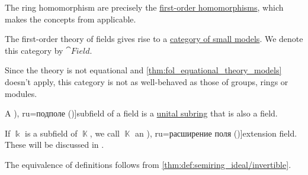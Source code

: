 \begin{definition}
\begin{thmenum}
    The ring homomorphism are precisely the \hyperref[def:fol_homomorphism]{first-order homomorphisms}, which makes the concepts from  applicable.

    \mimprovised The first-order theory of fields gives rise to a \hyperref[def:fol_theory_model_functor/obj]{category of small models}. We denote this category by \( \cat{Field} \).

    Since the theory is not equational and \cref{thm:fol_equational_theory_models} doesn't apply, this category is not as well-behaved as those of groups, rings or modules.

     A \term[bg=подполе (\cite[192]{ГеновМиховскиМоллов1991Алгебра}), ru=подполе (\cite[153]{Тыртышников2017ОсновыАлгебры})]{subfield} of a field is a \hyperref[def:ring/subobject]{unital subring} that is also a field.

    If \( \Bbbk \) is a subfield of \( \BbbK \), we call \( \BbbK \) an \term[bg=разширение на поле (\cite[194]{ГеновМиховскиМоллов1991Алгебра}), ru=расширение поля (\cite[160]{Кострикин2020АлгебраЧасть1})]{extension field}. These will be discussed in .
  \end{thmenum}
\end{definition}
\begin{defproof}
  The equivalence of definitions follows from \cref{thm:def:semiring_ideal/invertible}.
\end{defproof}
